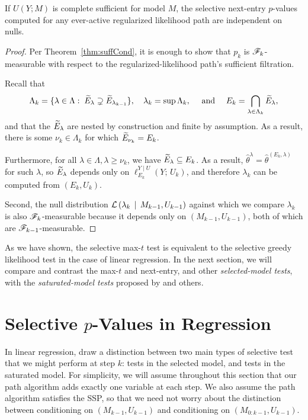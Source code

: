 \documentclass{article}
\begin{document}
\begin{corollary}\label{cor:nextLambdaIndep}
  If $U(Y; M)$ is complete sufficient for model $M$, the selective next-entry $p$-values computed for any ever-active regularized likelihood path are independent on nulls.
\end{corollary}
\begin{proof}
  Per Theorem~\ref{thm:suffCond}, it is enough to show that $p_k$ is $\mathscr{F}_k$-measurable with respect to the regularized-likelihood path's sufficient filtration.

  Recall that 
  \[
  \Lambda_k = \{\lambda\in \Lambda:\; \widetilde{E}_\lambda \supsetneq \widetilde{E}_{\lambda_{k-1}}\},
  \quad 
  \lambda_k = \sup\Lambda_k,
  \quad \text{ and } \quad
  E_k = \bigcap_{\lambda\in\Lambda_k} \widetilde{E}_{\lambda},
  \]
  and that the $\widetilde{E}_{\lambda}$ are nested by construction and finite by assumption. As a result, there is some $\nu_k\in \Lambda_k$ for which $\widetilde{E}_{\nu_k} = E_k$. 
  
  Furthermore, for all $\lambda\in\Lambda, \lambda\geq \nu_k$, we have $\widetilde{E}_\lambda \subseteq E_k$. As a result, ${\hat\theta^{\lambda} =\hat\theta^{(E_k,\lambda)}}$ for such $\lambda$, so $\widetilde{E}_{\lambda}$ depends only on $\ell_{E_k}^{Y\mid U}(Y;\, U_k)$, and therefore $\lambda_k$ can be computed from $(E_k, U_k)$.

  Second, the null distribution $\mathcal{L}\left(\lambda_k \,\mid\, M_{k-1}, U_{k-1}\right)$ against which we compare $\lambda_k$ is also $\mathscr{F}_k$-measurable because it depends only on $(M_{k-1}, U_{k-1})$, both of which are $\mathscr{F}_{k-1}$-measurable.
\end{proof}

As we have shown, the selective max-$t$ test is equivalent to the selective greedy likelihood test in the case of linear regression. In the next section, we will compare and contrast the max-$t$ and next-entry, and other {\em selected-model tests}, with the {\em saturated-model tests} proposed by \citet{taylor2014exact} and others. 

\section{Selective $p$-Values in Regression}
\label{sec:selective-reg}
In linear regression, \citet{fithian2014optimal} draw a distinction between two main types of selective test that we might perform at step $k$: tests in the selected model, and tests in the saturated model. For simplicity, we will assume throughout this section that our path algorithm adds exactly one variable at each step. We also assume the path algorithm satisfies the SSP, so that we need not worry about the distinction between conditioning on $(M_{k-1}, U_{k-1})$ and conditioning on $(M_{0:k-1}, U_{k-1})$.
\end{document}
